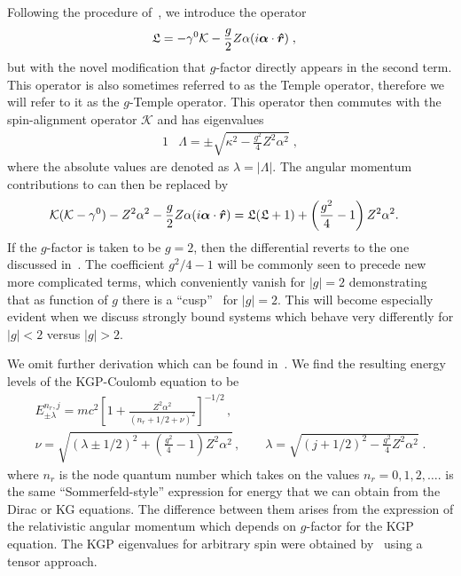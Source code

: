 Following the procedure of~\cite{Martin:1958zz}, we introduce the operator
\begin{alignat}{1}
\label{cou07} &\mathfrak{L}=-\gamma^{0}\mathcal{K}-\frac{g}{2}Z\alpha(i\boldsymbol{\alpha}\cdot\boldsymbol{\hat{r}})\;,
\end{alignat}
but with the novel modification that $g$-factor directly appears in the second term. This operator is also sometimes referred to as the Temple operator, therefore we will refer to it as the $g$-Temple operator. This operator then commutes with the spin-alignment operator $\mathcal{K}$ and has eigenvalues
\begin{alignat}{1}
\label{cou08} &\Lambda=\pm\sqrt{\kappa^{2}-\displaystyle\frac{\displaystyle g^{2}}{4}Z^{2}\alpha^{2}}\;,\end{alignat}
where the absolute values are denoted as $\lambda=|\Lambda|$. The angular momentum contributions to  can then be replaced by
\begin{alignat}{1}
\label{cou09} &\mathcal{K}(\mathcal{K}-\gamma^{0})-Z^{2}\alpha^{2}-\frac{g}{2}Z\alpha(i\boldsymbol{\alpha}\cdot\boldsymbol{\hat{r}})=\mathfrak{L}(\mathfrak{L}+1)+\left(\frac{g^{2}}{4}-1\right)Z^{2}\alpha^{2}.
\end{alignat}
If the $g$-factor is taken to be $g\!=\!2$, then the differential  reverts to the one discussed in~\cite{Martin:1958zz}. The coefficient $g^{2}/4-1$ will be commonly seen to precede new more complicated terms, which conveniently vanish for $|g|=2$ demonstrating that as function of $g$ there is a ``cusp''~\citep{Rafelski:2022bsv} for $|g|=2$. This will become especially evident when we discuss strongly bound systems which behave very differently for $|g|<2$ versus $|g|>2$. 

We omit further derivation which can be found in~\cite{Steinmetz:2018ryf}. We find the resulting energy levels of the KGP-Coulomb equation to be 
\begin{gather}
\label{cou17} E_{\pm\lambda}^{n_{r},j}=mc^{2}\left[1+\displaystyle\frac{Z^{2}\alpha^{2}}{\left(n_{r}+1/2+\nu\right)^{2}}\right]^{-1/2}\,,\\
\label{cou17b} \nu=\sqrt{(\lambda\pm1/2)^{2}+\left(\frac{g^{2}}{4}-1\right)Z^{2}\alpha^{2}}\,,\qquad
\lambda=\sqrt{\displaystyle(j+1/2)^{2}-\frac{\displaystyle g^{2}}{4}Z^{2}\alpha^{2}}\;.
\end{gather}
where $n_{r}$ is the node quantum number which takes on the values $n_{r}=0,1,2,\ldots$.  is the same ``Sommerfeld-style'' expression for energy that we can obtain from the Dirac or KG equations. The difference between them arises from the expression of the relativistic angular momentum which depends on $g$-factor for the KGP equation. The KGP eigenvalues  for arbitrary spin were obtained by~\cite{Niederle:2004bx} using a tensor approach.

